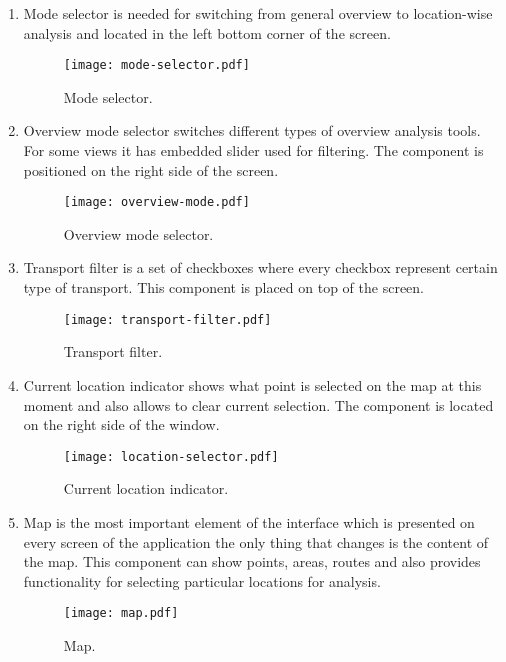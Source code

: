 \begin{enumerate}
  \item Mode selector is needed for switching from general overview to location-wise analysis and
  located in the left bottom corner of the screen.

  \begin{figure}[ht]
    \centering
    \texttt{[image: mode-selector.pdf]}
    \caption{Mode selector.}
    \label{pic:mode_selector}
  \end{figure}

  \item Overview mode selector switches different types of overview analysis tools. For some
  views it has embedded slider used for filtering. The component is positioned on the right
  side of the screen.

  \begin{figure}[ht]
    \centering
    \texttt{[image: overview-mode.pdf]}
    \caption{Overview mode selector.}
    \label{pic:overview_selector}
  \end{figure}

  \item Transport filter is a set of checkboxes where every checkbox represent certain
  type of transport. This component is placed on top of the screen.

  \begin{figure}[ht]
    \centering
    \texttt{[image: transport-filter.pdf]}
    \caption{Transport filter.}
    \label{pic:transport_filter}
  \end{figure}

  \item Current location indicator shows what point is selected on the map at this moment and
  also allows to clear current selection. The component is located on the right side of the window.

  \begin{figure}[ht]
    \centering
    \texttt{[image: location-selector.pdf]}
    \caption{Current location indicator.}
    \label{pic:location_selector}
  \end{figure}

  \item Map is the most important element of the interface which is presented on every screen
  of the application the only thing that changes is the content of the map.
  This component can show points, areas, routes and also provides functionality for
  selecting particular locations for analysis.

  \begin{figure}[ht]
    \centering
    \texttt{[image: map.pdf]}
    \caption{Map.}
    \label{pic:map}
  \end{figure}

\end{enumerate}

